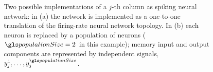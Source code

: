 \begin{figure}
	\centering
	\caption[Comparison between a single neuron BiNAM implementation and its population counterpart]{Two possible implementations of a $j$-th \BiNAM column as spiking neural network: in (a) the network is implemented as a one-to-one translation of the firing-rate neural network topology. In (b) each neuron is replaced by a population of \populationSize neurons ($\populationSize = 2$ in this example); memory input and output components are represented by \populationSize independent signals, $y^1_j, \ldots, y^{\populationSize}_j$.}
	\label{fig:spinam_topology}
\end{figure}

